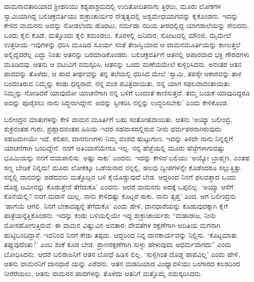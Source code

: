 ವಾಮನಾವತಾರಿಯಾದ ಶ್ರೀಹರಿಯು ಕಶ್ಯಪಾಶ್ರಮದಲ್ಲಿ ಉದಿತೋದಿತನಾಗು ತ್ತಿರಲು, ಮೂರು ಲೋಕಗಳ ಸ್ವಾಮಿಯಾಗಿದ್ದ ಬಲಿಚಕ್ರವರ್ತಿಯು ಶುಕ್ರಾಚಾರ್ಯರ ನೇತೃತ್ವದಲ್ಲಿ ಅಶ್ವಮೇಧಯಾಗವನ್ನು ಕೈಕೊಂಡನು. ಇದನ್ನು ಕೇಳಿದ ವಾಮನನು ಅದನ್ನು ನೋಡಲೆಂದು ಹೊರಟು, ನರ್ಮದಾ ನದಿಯ ತೀರದಲ್ಲಿದ್ದ ಯಾಗಶಾಲೆಯನ್ನು ಸೇರಿದನು. ಒಂದು ಕೈಲಿ ಕೊಡೆ, ಮತ್ತೊಂದು ಕೈಲಿ ಕಮಂಡಲು, ಕೊರಳಲ್ಲಿ ಜನಿವಾರ, ಸೊಂಟದಲ್ಲಿ ಮೌಂಜಿ, ಮೈಮೇಲೆ ಉತ್ತರೀಯ–ಇವುಗಳನ್ನು ಧರಿಸಿ ಮೂಡಿದ ಸೂರ್ಯ ನಂತೆ ತೇಜಸ್ವಿಯಾದ ಆ ವಾಮನಮೂರ್ತಿಯನ್ನು ಕಾಣುತ್ತಲೆ ಅಲ್ಲಿದ್ದವರೆಲ್ಲ ಎದ್ದು ನಿಂತು ಆತನನ್ನು ಬರಮಾಡಿಕೊಂಡರು. ಬಲಿಚಕ್ರವರ್ತಿಗೆ ಆತನಲ್ಲಿ ಅಪಾರವಾದ ಭಕ್ತಿ ಗೌರವಗಳು ಮೂಡಿದವು. ಆತನು ಆ ವಟುವಿಗೆ ನಮಸ್ಕರಿಸಿ, ಆತನನ್ನು ಒಂದು ಮಣೆಯಮೇಲೆ ಕುಳ್ಳಿರಿಸಿದನು. ಅನಂತರ ಆತನ ಪಾದವನ್ನು ತೊಳೆದು, ಆ ಪಾದ ತೀರ್ಥವನ್ನು ತನ್ನ ತಲೆಯಲ್ಲಿ ಧರಿಸಿದ ಮೇಲೆ ‘ಸ್ವಾಮಿ, ತಪಸ್ಸೇ ಆಕಾರವನ್ನು ತಾಳಿ ಬಂದಂತಿರುವ ನಿಮ್ಮನ್ನು ಕಂಡು ಧನ್ಯನಾದೆ, ನನ್ನ ವಂಶ ಪವಿತ್ರವಾಯಿತು, ನನ್ನ ಯಾಗ ಸಫಲವಾದಂತಾಯಿತು. ನಿಮ್ಮನ್ನು ನೋಡಿದರೆ ಯಾವುದೋ ಯಾಚನೆಗಾಗಿ ನನ್ನ ಬಳಿಗೆ ಬಂದಂತೆ ಕಾಣಿಸುತ್ತದೆ. ತಮ್ಮ ಬಯಕೆ ಯಾವುದಿದ್ದರೂ ಅದನ್ನು ಪೂರೈಸಲು ನಾನು ಸಿದ್ಧನಾಗಿದ್ದೇನೆ. ಅದನ್ನು ಸ್ವೀಕರಿಸಿ ನನ್ನನ್ನು ಉದ್ಧರಿಸಬೇಕು’ ಎಂದು ಕೇಳಿಕೊಂಡ.

ಬಲೀಂದ್ರನ ಮಾತುಗಳನ್ನು ಕೇಳಿ ವಾಮನ ಮೂರ್ತಿಗೆ ಬಹು ಸಂತೋಷವಾಯಿತು. ಆತನು ‘ಅಯ್ಯಾ ಬಲೀಂದ್ರ, ಶುಕ್ರನಂತಹ ಗುರು, ಪ್ರಹ್ಲಾದನಂತಹ ಹಿರಿಯ–ಇವರ ಸಹವಾಸದಲ್ಲಿರುವ ನೀನು ಧರ್ಮಪರನಾಗಿರುವುದು ಸಹಜವಾಗಿಯೇ ಇದೆ. ಕಲಿತನ, ದಾನಗುಣಗಳು ನಿಮ್ಮ ವಂಶದ ಹುಟ್ಟುಗುಣ. ಇದನ್ನು ತಿಳಿದೇ ನಾನು ನಿನ್ನಲ್ಲಿಗೆ ಯಾಚನೆಗಾಗಿ ಬಂದಿದ್ದೇನೆ. ನನಗೆ ಅತಿಯಾಸೆಯೇನೂ ಇಲ್ಲ. ನನ್ನ ಹೆಜ್ಜೆಯಲ್ಲಿ ಮೂರು ಹೆಜ್ಜೆಗಳಾಗುವಷ್ಟು ಭೂಮಿಯನ್ನು ನನಗೆ ದಯಪಾಲಿಸು. ಅಷ್ಟು ಸಾಕು’ ಎಂದನು. ಇದನ್ನು ಕೇಳಿದ ಬಲಿಯು ‘ಅಯ್ಯೋ ಬ್ರಾಹ್ಮಣ, ಎಂತಹ ಸಣ್ಣ ಬೇಡಿಕೆ ನಿನ್ನದು! ಮೂರು ಲೋಕಕ್ಕೂ ಒಡೆಯನಾದ ನನ್ನಲ್ಲಿ, ಹಲವು ದ್ವೀಪಗಳನ್ನೇ ಕೊಡೆಂದರೂ ಸಲ್ಲುತ್ತಿತ್ತು. ನನ್ನಲ್ಲಿ ದಾನವನ್ನು ಪಡೆದವನು ಮತ್ತೊಬ್ಬನ ಬಳಿ ಕೈಯೊಡ್ಡುವುದೆ ಬೇಡ. ಆದ್ದರಿಂದ ನಿನಗೆ ಫಲವತ್ತಾದ ಒಂದು ದೊಡ್ಡ ಜಮೀನನ್ನು ಕೊಡುತ್ತೇನೆ ತೆಗೆದುಕೊ’ ಎಂದನು. ಆದರೆ ವಾಮನನು ಅದಕ್ಕೆ ಒಪ್ಪಲಿಲ್ಲ. ‘ಅಯ್ಯಾ ಆಸೆಗೆ ಕೊನೆಯೆಲ್ಲಿ? ನನಗೆ ದುರಾಸೆ ಯಿಲ್ಲ. ನಾನು ಕೇಳಿದಷ್ಟು ಕೊಟ್ಟರೆ ಸಾಕು, ನಾನು ತೃಪ್ತ’ ಎಂದ. ಆಗ ಬಲೀಂದ್ರನು ‘ಹಾಗೆಯೆ ಆಗಲಿ. ನಿನಗೆ ಬೇಕಾದಷ್ಟನ್ನೆ ತೆಗೆದುಕೊ’ ಎಂದು ಹೇಳಿ, ದಾನಧಾರೆಯನ್ನು ಕೊಡುವುದಕ್ಕಾಗಿ ಕೈಗೆ ಪಾತ್ರೆಯನ್ನೆತ್ತಿಕೊಂಡನು. ಇದನ್ನು ಕಂಡು ಬಳಿಯಲ್ಲಿಯೇ ಇದ್ದ ಶುಕ್ರಾಚಾರ್ಯರು “ಮಹಾರಾಜ, ನೀನು ಮೋಸಹೋಗುತ್ತಿರುವೆ. ಈ ವಾಮನ ವಿಷ್ಣುವಿನ ಅವತಾರ; ದೇವತೆಗಳ ರಕ್ಷಣೆಗಾಗಿ ಅದಿತಿಯ ಮಗನಾಗಿ ಹುಟ್ಟಿಬಂದಿದ್ದಾನೆ. ಇವನಿಂದ ನಿನಗೆ ಕೇಡು ತಪ್ಪದು. ಆದ್ದರಿಂದ ನಿನ್ನ ದಾನಕಾರ್ಯವನ್ನು ನಿಲ್ಲಿಸು. ‘ಕೊಟ್ಟಮಾತು ತಪ್ಪುವುದೆಂತು?’ ಎಂಬ ಶಂಕೆ ಕೂಡ ಬೇಡ. ಪ್ರಾಣರಕ್ಷಣೆಗಾಗಿ ಸುಳ್ಳು ಹೇಳುವುದು ಅಧರ್ಮವಾಗದು” ಎಂದು ಬೋಧಿಸಿದನು. ಆದರೆ ಬಲಿರಾಜನಿಗೆ ಆತನ ಬೋಧೆ ಹಿಡಿಸ ಲಿಲ್ಲ. ‘ಸುಳ್ಳಿಗಿಂತ ದೊಡ್ಡ ಪಾಪವಿಲ್ಲ’ ಎಂದು ಹೇಳಿ, ಆತನು ವಾಮನನಿಗೆ ದಾನಧಾರೆ ಯನ್ನು ಎರೆದನು. ಆತನ ಮಡದಿಯಾದ ವಿಂಧ್ಯಾವಳಿಯು ಬಂಗಾರದ ಕಲಶದಿಂದ ನೀರೆರೆಯಲು, ಆತನು ವಾಮನನ ಪಾದಗಳನ್ನು ತೊಳೆದು ಆತನಿಗೆ ಮತ್ತೊಮ್ಮೆ ನಮಸ್ಕರಿಸಿದನು.

